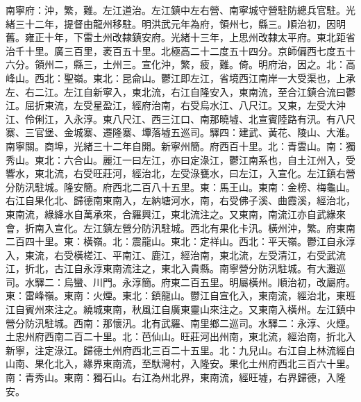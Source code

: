 \begin{pinyinscope}
南寧府：沖，繁，難。左江道治。左江鎮中左右營、南寧城守營駐防總兵官駐。光緒三十二年，提督由龍州移駐。明洪武元年為府，領州七，縣三。順治初，因明舊。雍正十年，下雷土州改隸鎮安府。光緒十三年，上思州改隸太平府。東北距省治千十里。廣三百里，袤百五十里。北極高二十二度五十四分。京師偏西七度五十六分。領州二，縣三，土州三。宣化沖，繁，疲，難。倚。明府治，因之。北：高峰山。西北：聖嶺。東北：昆侖山。鬱江即左江，省境西江南岸一大受渠也，上承左、右二江。左江自新寧入，東北流，右江自隆安入，東南流，至合江鎮合流曰鬱江。屈折東流，左受星盈江，經府治南，右受烏水江、八尺江。又東，左受大沖江、伶俐江，入永淳。東八尺江、西三江口、南那曉墟、北宣賓陸路有汛。有八尺寨、三官堡、金城寨、遷隆寨、墰落墟五巡司。驛四：建武、黃花、陵山、大淮。南寧關。商埠，光緒三十二年自開。新寧州簡。府西百十里。北：青雲山。南：獨秀山。東北：六合山。麗江一曰左江，亦曰定淥江，鬱江南系也，自土江州入，受響水，東北流，右受旺莊河，經治北，左受淥甕水，曰左江，入宣化。左江鎮右營分防汛駐城。隆安簡。府西北二百八十五里。東：馬王山。東南：金榜、梅龜山。右江自果化北、歸德南東南入，左納塘河水，南，右受佛子溪、曲霞溪，經治北，東南流，綠絳水自萬承來，合羅興江，東北流注之。又東南，南流江亦自武緣來會，折南入宣化。左江鎮左營分防汛駐城。西北有果化卡汛。橫州沖，繁。府東南二百四十里。東：橫嶺。北：震龍山。東北：定祥山。西北：平天嶺。鬱江自永淳入，東流，右受橫槎江、平南江、鹿江，經治南，東北流，左受清江，右受武流江，折北，古江自永淳東南流注之，東北入貴縣。南寧營分防汛駐城。有大灘巡司。水驛二：烏蠻、川門。永淳簡。府東二百五里。明屬橫州。順治初，改屬府。東：雷峰嶺。東南：火煙。東北：鎮龍山。鬱江自宣化入，東南流，經治北，東班江自賓州來注之。繞城東南，秋風江自廣東靈山來注之。又東南入橫州。左江鎮中營分防汛駐城。西南：那懷汛。北有武羅、南里鄉二巡司。水驛二：永淳、火煙。土忠州府西南二百二十里。北：芭仙山。旺莊河出州南，東北流，經治南，折北入新寧，注定淥江。歸德土州府西北三百二十五里。北：九兒山。右江自上林流經白山南、果化北入，緣界東南流，至馱灣村，入隆安。果化土州府西北三百六十里。南：青秀山。東南：獨石山。右江為州北界，東南流，經旺墟，右界歸德，入隆安。


\end{pinyinscope}
